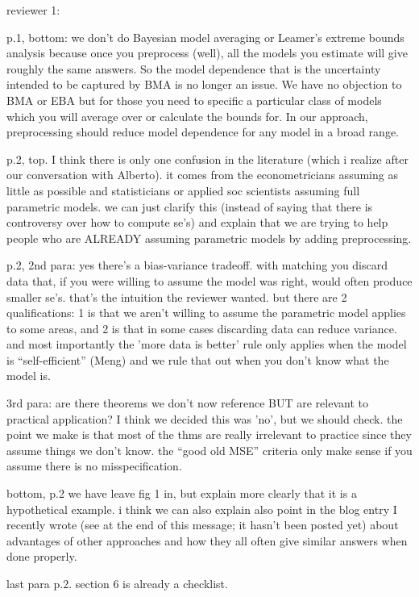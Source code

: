 reviewer 1:

p.1, bottom: we don't do Bayesian model averaging or Leamer's extreme
bounds analysis because once you preprocess (well), all the models you
estimate will give roughly the same answers.  So the model dependence
that is the uncertainty intended to be captured by BMA is no longer an
issue.  We have no objection to BMA or EBA but for those you need to
specific a particular class of models which you will average over or
calculate the bounds for.  In our approach, preprocessing should
reduce model dependence for any model in a broad range. 

p.2, top.  I think there is only one confusion in the literature
(which i realize after our conversation with Alberto). it comes from
the econometricians assuming as little as possible and statisticians
or applied soc scientists assuming full parametric models.  we can
just clarify this (instead of saying that there is controversy over
how to compute se's) and explain that we are trying to help people who
are ALREADY assuming parametric models by adding preprocessing.

p.2, 2nd para: yes there's a bias-variance tradeoff.  with matching
you discard data that, if you were willing to assume the model was
right, would often produce smaller se's.  that's the intuition the
reviewer wanted. but there are 2 qualifications:  1 is that we aren't
willing to assume the parametric model applies to some areas, and 2 is
that in some cases discarding data can reduce variance.  and most
importantly the 'more data is better' rule only applies when the model
is ``self-efficient'' (Meng) and we rule that out when you don't know
what the model is.

3rd para: are there theorems we don't now reference BUT are relevant
to practical application?  I think we decided this was 'no', but we
should check.  the point we make is that most of the thms are really
irrelevant to practice since they assume things we don't know.  the
``good old MSE'' criteria only make sense if you assume there is no
misspecification. 

bottom, p.2 we have leave fig 1 in, but explain more clearly that it
is a hypothetical example.  i think we can also explain also point in
the blog entry I recently wrote (see at the end of this message; it
hasn't been posted yet) about advantages of other approaches and how
they all often give similar answers when done properly.

last para p.2.  section 6 is already a checklist.

